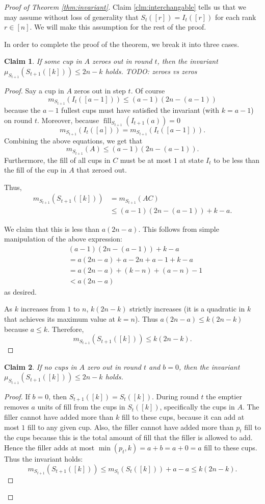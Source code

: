 \documentclass[twocolumn]{article}[10pt]
\DeclareMathOperator{\fil}{\text{fill}}
\newtheorem{clm}{Claim}
\begin{document}
\begin{proof}[Proof of Theorem \ref{thm:invariant}]
Claim \ref{clm:interchangable} tells us that we may assume without loss of generality that $S_t([r]) = I_t([r])$ for each rank $r \in [n]$. We will make this assumption for the rest of the proof. 

In order to complete the proof of the theorem, we break it into three cases. 

\begin{clm}
  If some cup in $A$ zeroes out in round $t$, then the invariant $\mu_{S_{t+1}}(S_{t+1}([k])) \le 2n-k$ holds.
  {\color{red} TODO: zeroes vs zeros}
\end{clm}
\begin{proof}
  Say a cup in $A$ zeros out in step $t$. 
  Of course
  $$m_{S_{t+1}}(I_t([a-1])) \le (a-1)(2n-(a-1))$$
  because the $a-1$ fullest cups must have satisfied the invariant (with $k = a - 1$) on round
  $t$. Moreover, because $\fil_{S_{t+1}}(I_{t+1}(a)) = 0$
  $$m_{S_{t+1}}(I_t([a])) = m_{S_{t+1}}(I_t([a-1])).$$
  Combining the above equations, we get that
  $$m_{S_{t+1}}(A) \le (a-1)(2n-(a-1)).$$
  Furthermore, the fill of all cups in $C$ must be at most $1$ at state $I_t$ to be
  less than the fill of the cup in $A$ that zeroed out.

  Thus, 
  \begin{align*}
      m_{S_{t+1}}(S_{t+1}([k])) & = m_{S_{t + 1}}(AC)\\ & \le (a-1)(2n-(a-1))+k-a.
  \end{align*}
  
  We claim that this is less than $a(2n-a)$. 
  This follows from simple manipulation of the above expression:
  \begin{align*}
    &(a-1)(2n-(a-1))+k-a\\
    &= a(2n-a) +a -2n+a-1 + k -a\\
    &= a(2n-a) + (k-n) + (a-n) -1\\
    &< a(2n-a)
  \end{align*}
  as desired.

  As $k$ increases from $1$ to $n$, $k(2n-k)$ strictly increases (it is a
  quadratic in $k$ that achieves its maximum value at $k=n$).
  Thus $a(2n-a) \le k(2n-k)$ because $a\le k$.
  Therefore,
  $$m_{S_{t+1}}(S_{t+1}([k])) \le k(2n-k).$$
\end{proof}

\begin{clm}
  If no cups in $A$ zero out in round $t$ and $b=0$, then the invariant $\mu_{S_{t+1}}(S_{t+1}([k])) \le 2n-k$ holds.
\end{clm}
\begin{proof}
If $b=0$, then $S_{t+1}([k]) = S_t([k])$. 
During round $t$ the emptier removes $a$ units of fill from the cups in $S_t([k])$,
specifically the cups in $A$. The filler cannot have added more than $k$ fill
to these cups, because it can add at most $1$ fill to any given cup. Also, the
filler cannot have added more than $p_t$ fill to the cups because this is the
total amount of fill that the filler is allowed to add. Hence the filler adds
at most $\min(p_t, k) = a+b=a+0=a$ fill to these cups.
Thus the invariant holds:
$$m_{S_{t+1}}(S_{t+1}([k])) \le m_{S_t}(S_t([k]))+a-a \le k(2n-k).$$
\end{proof}


\end{proof}
\end{document}
